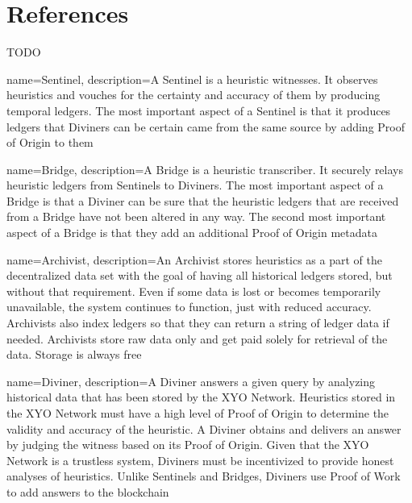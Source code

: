 \documentclass{article}
\begin{document}
\section {References}
TODO


\clearpage



{
    name={Sentinel},
    description={A Sentinel is a heuristic witnesses. It observes heuristics and vouches for the certainty and accuracy of them by producing temporal ledgers. The most important aspect of a Sentinel is that it produces ledgers that Diviners can be certain came from the same source by adding Proof of Origin to them}
}



{
    name={Bridge},
    description={A Bridge is a heuristic transcriber. It securely relays heuristic ledgers from Sentinels to Diviners. The most important aspect of a Bridge is that a Diviner can be sure that the heuristic ledgers that are received from a Bridge have not been altered in any way. The second most important aspect of a Bridge is that they add an additional Proof of Origin metadata}
}

{
    name={Archivist},
    description={An Archivist stores heuristics as a part of the decentralized data set with the goal of having all historical ledgers stored, but without that requirement. Even if some data is lost or becomes temporarily unavailable, the system continues to function, just with reduced accuracy. Archivists also index ledgers so that they can return a string of ledger data if needed. Archivists store raw data only and get paid solely for retrieval of the data. Storage is always free}
}

{
    name={Diviner},
    description={A Diviner answers a given query by analyzing historical data that has been stored by the XYO Network. Heuristics stored in the XYO Network must have a high level of Proof of Origin to determine the validity and accuracy of the heuristic. A Diviner obtains and delivers an answer by judging the witness based on its Proof of Origin. Given that the XYO Network is a trustless system, Diviners must be incentivized to provide honest analyses of heuristics. Unlike Sentinels and Bridges, Diviners use Proof of Work to add answers to the blockchain}
}
\end{document}

